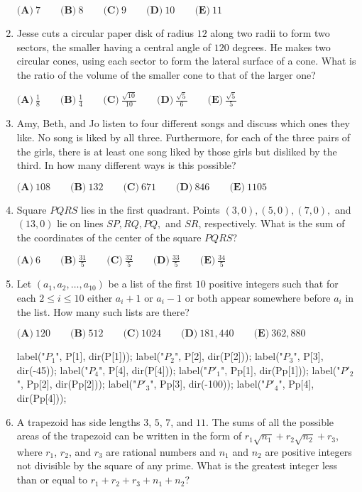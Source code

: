 \documentclass{article}
\begin{document}
\begin{enumerate}[label=\arabic*., itemsep=0.5em]
$ \textbf{(A)}\ 7\qquad\textbf{(B)}\ 8\qquad\textbf{(C)}\ 9\qquad\textbf{(D)}\ 10\qquad\textbf{(E)}\ 11 $\par \vspace{0.5em}\item Jesse cuts a circular paper disk of radius $12$ along two radii to form two sectors, the smaller having a central angle of $120$ degrees. He makes two circular cones, using each sector to form the lateral surface of a cone. What is the ratio of the volume of the smaller cone to that of the larger one?

$\textbf{(A)}\ \frac{1}{8}\qquad\textbf{(B)}\ \frac{1}{4}\qquad\textbf{(C)}\ \frac{\sqrt{10}}{10}\qquad\textbf{(D)}\ \frac{\sqrt{5}}{6}\qquad\textbf{(E)}\ \frac{\sqrt{5}}{5}$\par \vspace{0.5em}\item Amy, Beth, and Jo listen to four different songs and discuss which ones they like. No song is liked by all three. Furthermore, for each of the three pairs of the girls, there is at least one song liked by those girls but disliked by the third. In how many different ways is this possible?

$\textbf{(A)}\ 108\qquad\textbf{(B)}\ 132\qquad\textbf{(C)}\ 671\qquad\textbf{(D)}\ 846\qquad\textbf{(E)}\ 1105 $\par \vspace{0.5em}\item Square $PQRS$ lies in the first quadrant. Points $(3,0), (5,0), (7,0),$ and $(13,0)$ lie on lines $SP, RQ, PQ,$ and $SR$, respectively. What is the sum of the coordinates of the center of the square $PQRS$?

$\textbf{(A)}\ 6\qquad\textbf{(B)}\ \frac{31}{5}\qquad\textbf{(C)}\ \frac{32}{5}\qquad\textbf{(D)}\ \frac{33}{5}\qquad\textbf{(E)}\ \frac{34}{5} $\par \vspace{0.5em}\item Let $(a_1,a_2, \dots ,a_{10})$ be a list of the first $10$ positive integers such that for each $2 \le i \le 10$ either $a_i+1$ or $a_i-1$ or both appear somewhere before $a_i$ in the list. How many such lists are there?

$\textbf{(A)}\ 120\qquad\textbf{(B)}\ 512\qquad\textbf{(C)}\ 1024\qquad\textbf{(D)}\ 181,440\qquad\textbf{(E)}\ 362,880$


label("$P_1$", P[1], dir(P[1]));
label("$P_2$", P[2], dir(P[2]));
label("$P_3$", P[3], dir(-45));
label("$P_4$", P[4], dir(P[4]));
label("$P'_1$", Pp[1], dir(Pp[1]));
label("$P'_2$", Pp[2], dir(Pp[2]));
label("$P'_3$", Pp[3], dir(-100));
label("$P'_4$", Pp[4], dir(Pp[4]));\par \vspace{0.5em}\item A trapezoid has side lengths $3$, $5$, $7$, and $11$. The sums of all the possible areas of the trapezoid can be written in the form of $r_1\sqrt{n_1}+r_2\sqrt{n_2}+r_3$, where $r_1$, $r_2$, and $r_3$ are rational numbers and $n_1$ and $n_2$ are positive integers not divisible by the square of any prime. What is the greatest integer less than or equal to $r_1+r_2+r_3+n_1+n_2$?


\end{enumerate}
\end{document}
